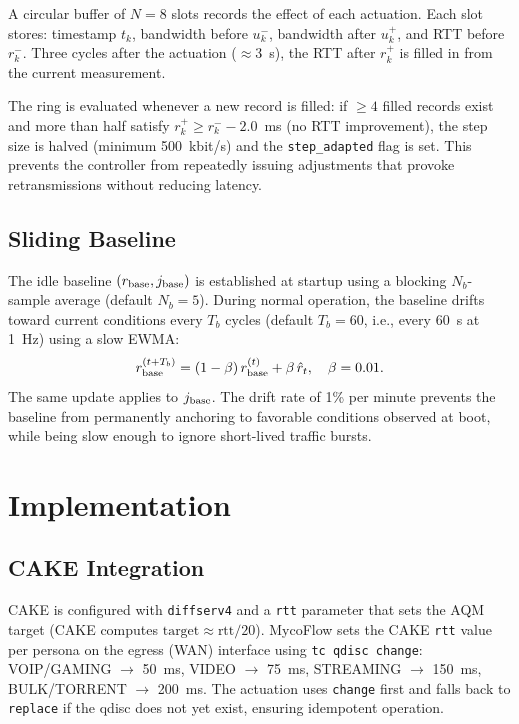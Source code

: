 \documentclass[conference]{IEEEtran}
\begin{document}
A circular buffer of $N=8$ slots records the effect of each actuation.
Each slot stores: timestamp $t_k$, bandwidth before $u_k^-$, bandwidth
after $u_k^+$, and RTT before $r_k^-$.
Three cycles after the actuation ($\approx 3$~s), the RTT after $r_k^+$
is filled in from the current measurement.

The ring is evaluated whenever a new record is filled:
if $\geq 4$ filled records exist and more than half satisfy
$r_k^+ \geq r_k^- - 2.0$~ms (no RTT improvement),
the step size is halved (minimum 500~kbit/s) and the \texttt{step\_adapted}
flag is set.
This prevents the controller from repeatedly issuing adjustments that
provoke retransmissions without reducing latency.

\subsection{Sliding Baseline}
\label{subsec:baseline}

The idle baseline $(r_{\rm base}, j_{\rm base})$ is established at startup
using a blocking $N_b$-sample average (default $N_b=5$).
During normal operation, the baseline drifts toward current conditions
every $T_b$ cycles (default $T_b=60$, i.e., every 60~s at 1~Hz) using
a slow EWMA:
\begin{equation}
  r_{\rm base}^{(t+T_b)} = (1-\beta)\,r_{\rm base}^{(t)} + \beta\,\hat{r}_t,
  \quad \beta = 0.01.
  \label{eq:baseline}
\end{equation}
The same update applies to $j_{\rm base}$.
The drift rate of 1\% per minute prevents the baseline from permanently
anchoring to favorable conditions observed at boot, while being slow
enough to ignore short-lived traffic bursts.

\section{Implementation}
\label{sec:impl}

\subsection{CAKE Integration}

CAKE is configured with \texttt{diffserv4} and a \texttt{rtt} parameter
that sets the AQM target (CAKE computes $\text{target} \approx \text{rtt}/20$).
MycoFlow sets the CAKE \texttt{rtt} value per persona on the egress
(WAN) interface using \texttt{tc qdisc change}:
VOIP/GAMING $\to$ 50~ms, VIDEO $\to$ 75~ms,
STREAMING $\to$ 150~ms, BULK/TORRENT $\to$ 200~ms.
The actuation uses \texttt{change} first and falls back to \texttt{replace}
if the qdisc does not yet exist, ensuring idempotent operation.
\end{document}
